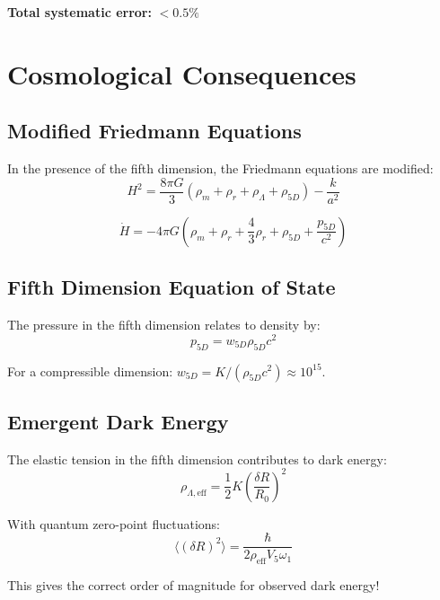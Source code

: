 \documentclass[10pt]{article}
\begin{document}
\textbf{Total systematic error:} $< 0.5\%$

\section{Cosmological Consequences}

\subsection{Modified Friedmann Equations}

In the presence of the fifth dimension, the Friedmann equations are modified:
\begin{equation}
H^2 = \frac{8\pi G}{3}(\rho_m + \rho_r + \rho_\Lambda + \rho_{5D}) - \frac{k}{a^2}
\end{equation}

\begin{equation}
\dot{H} = -4\pi G\left(\rho_m + \rho_r + \frac{4}{3}\rho_r + \rho_{5D} + \frac{p_{5D}}{c^2}\right)
\end{equation}

\subsection{Fifth Dimension Equation of State}

The pressure in the fifth dimension relates to density by:
\begin{equation}
p_{5D} = w_{5D} \rho_{5D} c^2
\end{equation}

For a compressible dimension: $w_{5D} = K/(\rho_{5D}c^2) \approx 10^{15}$.

\subsection{Emergent Dark Energy}

The elastic tension in the fifth dimension contributes to dark energy:
\begin{equation}
\rho_{\Lambda,\text{eff}} = \frac{1}{2} K \left(\frac{\delta R}{R_0}\right)^2
\end{equation}

With quantum zero-point fluctuations:
\begin{equation}
\langle(\delta R)^2\rangle = \frac{\hbar}{2\rho_{\text{eff}} V_5 \omega_1}
\end{equation}

This gives the correct order of magnitude for observed dark energy!
\end{document}
